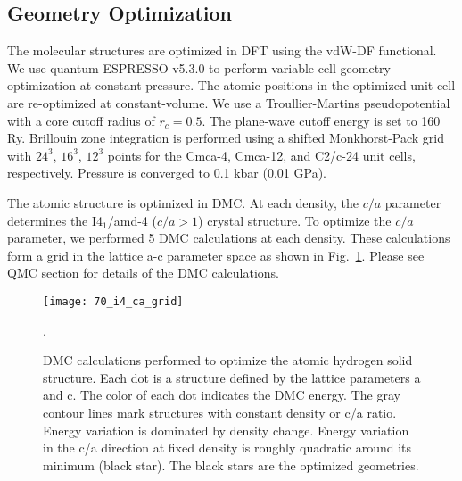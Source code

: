 \subsection{Geometry Optimization}
The molecular structures are optimized in DFT using the vdW-DF functional. We use quantum ESPRESSO v5.3.0 to perform variable-cell geometry optimization at constant pressure. The atomic positions in the optimized unit cell are re-optimized at constant-volume. We use a Troullier-Martins pseudopotential with a core cutoff radius of $r_c=0.5$. The plane-wave cutoff energy is set to 160 Ry. Brillouin zone integration is performed using a shifted Monkhorst-Pack grid with $24^3$, $16^3$, $12^3$ points for the Cmca-4, Cmca-12, and C2/c-24 unit cells, respectively. %
Pressure is converged to 0.1 kbar (0.01 GPa). %

The atomic structure is optimized in DMC. At each density, the $c/a$ parameter determines the I4$_1$/amd-4 ($c/a>1$) crystal structure. To optimize the $c/a$ parameter, we performed 5 DMC calculations at each density. These calculations form a grid in the lattice a-c parameter space as shown in Fig.~\ref{fig:i4-rs-ca}. Please see QMC section for details of the DMC calculations.
\begin{figure}[h]
\texttt{[image: 70\_i4\_ca\_grid]}
\caption{DMC calculations performed to optimize the atomic hydrogen solid structure. Each dot is a structure defined by the lattice parameters a and c. The color of each dot indicates the DMC energy. The gray contour lines mark structures with constant density or c/a ratio. Energy variation is dominated by density change. Energy variation in the c/a direction at fixed density is roughly quadratic around its minimum (black star). The black stars are the optimized geometries.\label{fig:i4-rs-ca}}.
\end{figure}